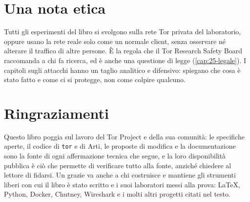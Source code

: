 \section*{Una nota etica}

Tutti gli esperimenti del libro si svolgono sulla rete Tor privata del laboratorio, oppure usano la rete reale solo come un normale client, senza osservare né alterare il traffico di altre persone. È la regola che il Tor Research Safety Board raccomanda a chi fa ricerca, ed è anche una questione di legge (\cref{cap:25-legale}). I capitoli sugli attacchi hanno un taglio analitico e difensivo: spiegano che cosa è stato fatto e come ci si protegge, non come colpire qualcuno.

\section*{Ringraziamenti}

Questo libro poggia sul lavoro del Tor Project e della sua comunit\`a: le specifiche aperte, il codice di \texttt{tor} e di Arti, le proposte di modifica e la documentazione sono la fonte di ogni affermazione tecnica che segue, e la loro disponibilit\`a pubblica \`e ci\`o che permette di verificare tutto alla fonte, anzich\'e chiedere al lettore di fidarsi. Un grazie va anche a chi costruisce e mantiene gli strumenti liberi con cui il libro \`e stato scritto e i suoi laboratori messi alla prova: \LaTeX{}, Python, Docker, Chutney, Wireshark e i molti altri progetti citati nel testo.
